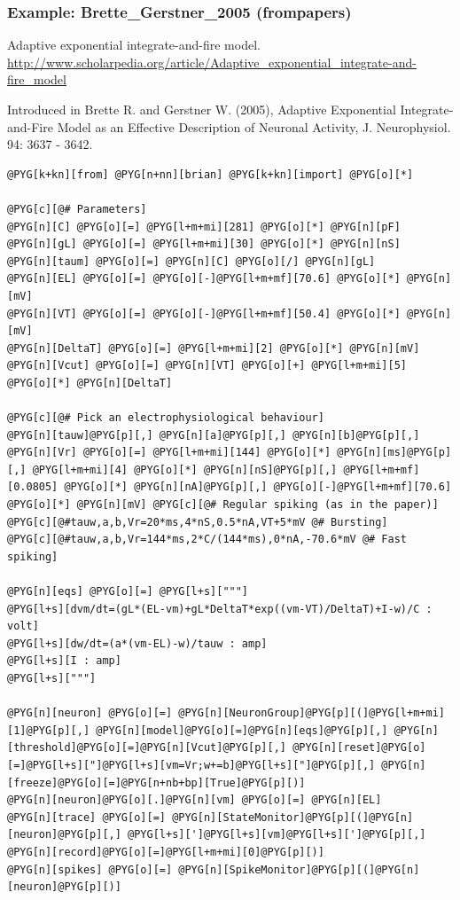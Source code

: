 \documentclass[letterpaper,10pt,english]{manual}
\begin{document}
\hypertarget{index-27}{}\subsubsection{Example: Brette\_Gerstner\_2005 (frompapers)}

Adaptive exponential integrate-and-fire model.
\href{http://www.scholarpedia.org/article/Adaptive\_exponential\_integrate-and-fire\_model}{http://www.scholarpedia.org/article/Adaptive\_exponential\_integrate-and-fire\_model}

Introduced in Brette R. and Gerstner W. (2005), Adaptive Exponential
Integrate-and-Fire Model as an Effective Description of Neuronal Activity,
J. Neurophysiol. 94: 3637 - 3642.

\begin{Verbatim}[commandchars=@\[\]]
@PYG[k+kn][from] @PYG[n+nn][brian] @PYG[k+kn][import] @PYG[o][*]

@PYG[c][@# Parameters]
@PYG[n][C] @PYG[o][=] @PYG[l+m+mi][281] @PYG[o][*] @PYG[n][pF]
@PYG[n][gL] @PYG[o][=] @PYG[l+m+mi][30] @PYG[o][*] @PYG[n][nS]
@PYG[n][taum] @PYG[o][=] @PYG[n][C] @PYG[o][/] @PYG[n][gL]
@PYG[n][EL] @PYG[o][=] @PYG[o][-]@PYG[l+m+mf][70.6] @PYG[o][*] @PYG[n][mV]
@PYG[n][VT] @PYG[o][=] @PYG[o][-]@PYG[l+m+mf][50.4] @PYG[o][*] @PYG[n][mV]
@PYG[n][DeltaT] @PYG[o][=] @PYG[l+m+mi][2] @PYG[o][*] @PYG[n][mV]
@PYG[n][Vcut] @PYG[o][=] @PYG[n][VT] @PYG[o][+] @PYG[l+m+mi][5] @PYG[o][*] @PYG[n][DeltaT]

@PYG[c][@# Pick an electrophysiological behaviour]
@PYG[n][tauw]@PYG[p][,] @PYG[n][a]@PYG[p][,] @PYG[n][b]@PYG[p][,] @PYG[n][Vr] @PYG[o][=] @PYG[l+m+mi][144] @PYG[o][*] @PYG[n][ms]@PYG[p][,] @PYG[l+m+mi][4] @PYG[o][*] @PYG[n][nS]@PYG[p][,] @PYG[l+m+mf][0.0805] @PYG[o][*] @PYG[n][nA]@PYG[p][,] @PYG[o][-]@PYG[l+m+mf][70.6] @PYG[o][*] @PYG[n][mV] @PYG[c][@# Regular spiking (as in the paper)]
@PYG[c][@#tauw,a,b,Vr=20*ms,4*nS,0.5*nA,VT+5*mV @# Bursting]
@PYG[c][@#tauw,a,b,Vr=144*ms,2*C/(144*ms),0*nA,-70.6*mV @# Fast spiking]

@PYG[n][eqs] @PYG[o][=] @PYG[l+s]["""]
@PYG[l+s][dvm/dt=(gL*(EL-vm)+gL*DeltaT*exp((vm-VT)/DeltaT)+I-w)/C : volt]
@PYG[l+s][dw/dt=(a*(vm-EL)-w)/tauw : amp]
@PYG[l+s][I : amp]
@PYG[l+s]["""]

@PYG[n][neuron] @PYG[o][=] @PYG[n][NeuronGroup]@PYG[p][(]@PYG[l+m+mi][1]@PYG[p][,] @PYG[n][model]@PYG[o][=]@PYG[n][eqs]@PYG[p][,] @PYG[n][threshold]@PYG[o][=]@PYG[n][Vcut]@PYG[p][,] @PYG[n][reset]@PYG[o][=]@PYG[l+s]["]@PYG[l+s][vm=Vr;w+=b]@PYG[l+s]["]@PYG[p][,] @PYG[n][freeze]@PYG[o][=]@PYG[n+nb+bp][True]@PYG[p][)]
@PYG[n][neuron]@PYG[o][.]@PYG[n][vm] @PYG[o][=] @PYG[n][EL]
@PYG[n][trace] @PYG[o][=] @PYG[n][StateMonitor]@PYG[p][(]@PYG[n][neuron]@PYG[p][,] @PYG[l+s][']@PYG[l+s][vm]@PYG[l+s][']@PYG[p][,] @PYG[n][record]@PYG[o][=]@PYG[l+m+mi][0]@PYG[p][)]
@PYG[n][spikes] @PYG[o][=] @PYG[n][SpikeMonitor]@PYG[p][(]@PYG[n][neuron]@PYG[p][)]


\end{Verbatim}
\end{document}
